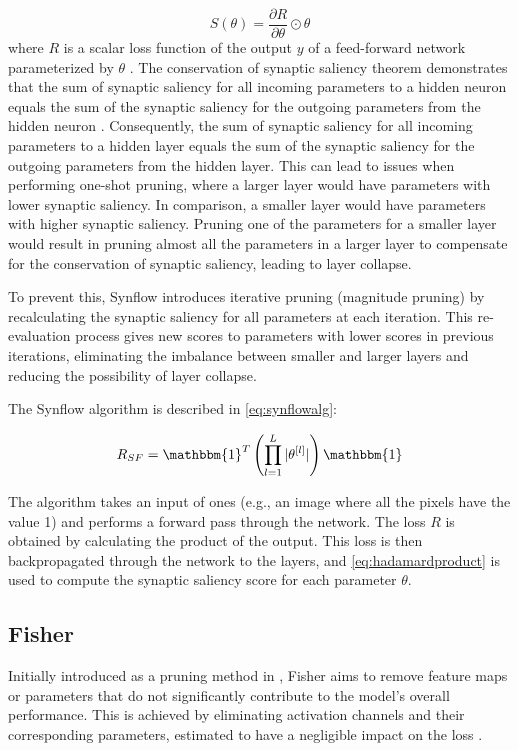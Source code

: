 \begin{equation}
S(\theta) = \frac{\partial R}{\partial \theta} \odot \theta
\label{eq:hadamardproduct}
\end{equation}
where $R$ is a scalar loss function of the output $y$ of a feed-forward network parameterized by $\theta$ \autocite{tanaka2020pruning}. The conservation of synaptic saliency theorem demonstrates that the sum of synaptic saliency for all incoming parameters to a hidden neuron equals the sum of the synaptic saliency for the outgoing parameters from the hidden neuron \autocite{tanaka2020pruning}. Consequently, the sum of synaptic saliency for all incoming parameters to a hidden layer equals the sum of the synaptic saliency for the outgoing parameters from the hidden layer. This can lead to issues when performing one-shot pruning, where a larger layer would have parameters with lower synaptic saliency. In comparison, a smaller layer would have parameters with higher synaptic saliency. Pruning one of the parameters for a smaller layer would result in pruning almost all the parameters in a larger layer to compensate for the conservation of synaptic saliency, leading to layer collapse.

\noindent To prevent this, \gls{Synflow} introduces iterative pruning (magnitude pruning) by recalculating the synaptic saliency for all parameters at each iteration. This re-evaluation process gives new scores to parameters with lower scores in previous iterations, eliminating the imbalance between smaller and larger layers and reducing the possibility of layer collapse.

\noindent The \gls{Synflow} algorithm is described in \cref{eq:synflowalg}:

\begin{equation}\label{eq:\gls{synflow}alg}
R_{SF} = \mathbbm{1}^T \left( \prod^L_{l=1} |\theta^{[l]}| \right) \mathbbm{1}
\end{equation}

The algorithm takes an input of ones (e.g., an image where all the pixels have the value 1) and performs a forward pass through the network. The loss $R$ is obtained by calculating the product of the output. This loss is then backpropagated through the network to the layers, and \cref{eq:hadamardproduct} is used to compute the synaptic saliency score for each parameter $\theta$.

\subsection{Fisher}
Initially introduced as a pruning method in \autocite{DBLP:journals/corr/abs-1801-05787}, Fisher aims to remove feature maps or parameters that do not significantly contribute to the model's overall performance. This is achieved by eliminating activation channels and their corresponding parameters, estimated to have a negligible impact on the loss \autocite{abdelfattah2021zero}.

